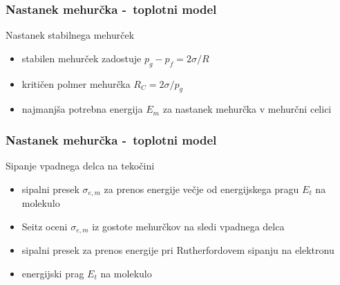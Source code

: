 \documentclass[14pt, t]{beamer}
\begin{document}
\begin{frame}
  \frametitle{Nastanek mehurčka -~toplotni model}
  \begin{block}{Nastanek stabilnega mehurček}
    \begin{itemize}
      \item <1-> stabilen mehurček zadostuje  $ p_g - p_f = 2 \sigma / R  $
      \item <2-> kritičen polmer mehurčka \( R_C = 2 \sigma / p_g \)
      \item <3-> najmanjša potrebna energija \( E_m \) za nastanek mehurčka v mehurčni celici
    \end{itemize}
    \vspace{1cm}
  \end{block}
\end{frame}

\begin{frame}
  \frametitle{Nastanek mehurčka -~toplotni model}
  \begin{block}{Sipanje vpadnega delca na tekočini}
    \begin{itemize}
      \item <1-> sipalni presek \( \sigma_{e, m} \) za prenos energije večje od energijskega pragu \( E_t \) na molekulo
      \item <2-> Seitz oceni \( \sigma_{e,m} \) iz gostote mehurčkov na sledi vpadnega delca
      \item <3-> sipalni presek za prenos energije pri Rutherfordovem sipanju na elektronu
      \item <4-> energijski prag \( E_t \) na molekulo
    \end{itemize}

  \end{block}
\end{frame}
\end{document}
